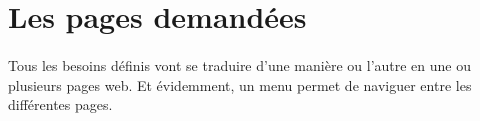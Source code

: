 \section{Les pages demandées}
\label{subsec:requested-pages}

\paragraph{}
Tous les besoins définis vont se traduire d'une manière ou l'autre en une ou plusieurs pages web.
Et évidemment, un menu permet de naviguer entre les différentes pages.










